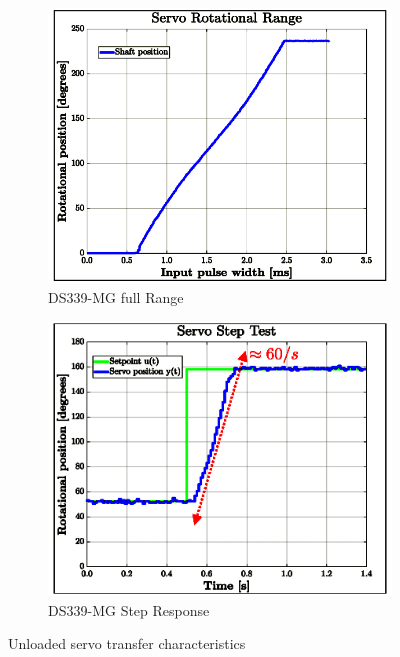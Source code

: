\begin{figure}[htbp]
\vspace{-6pt}
\centering
\begin{subfigure}{0.49\textwidth}
\centering
\includegraphics[width=\textwidth]{graphs/servo-range}
\caption{DS339-MG full Range}
\label{fig:servo-range}
\end{subfigure}
\begin{subfigure}{0.49\textwidth}
\centering
\includegraphics[width=\textwidth]{graphs/servo-step}
\caption{DS339-MG Step Response}
\label{fig:servo-step}
\end{subfigure}
\vspace{-8pt}
\caption{Unloaded servo transfer characteristics}
\label{fig:servo-no-load}
\vspace{-16pt}
\end{figure}
